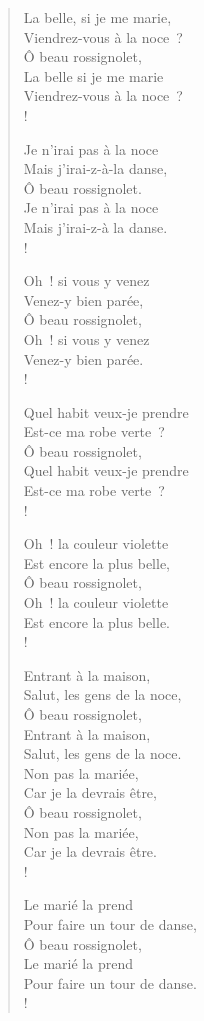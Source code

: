 \documentclass[french,twoside]{book} %
\begin{document}
\begin{verse}
La belle, si je me marie,\\
Viendrez-vous à la noce ?\\
Ô beau rossignolet,\\
La belle si je me marie\\
Viendrez-vous à la noce ?\\!

Je n’irai pas à la noce\\
Mais j’irai-z-à-la danse,\\
Ô beau rossignolet.\\
Je n’irai pas à la noce\\
Mais j’irai-z-à la danse.\\!

Oh ! si vous y venez\\
Venez-y bien parée,\\
Ô beau rossignolet,\\
Oh ! si vous y venez\\
Venez-y bien parée.\\!

Quel habit veux-je prendre\\
Est-ce ma robe verte ?\\
Ô beau rossignolet,\\
Quel habit veux-je prendre\\
Est-ce ma robe verte ?\\!

Oh ! la couleur violette\\
Est encore la plus belle,\\
Ô beau rossignolet,\\
Oh ! la couleur violette\\
Est encore la plus belle.\\!

Entrant à la maison,\\
Salut, les gens de la noce,\\
Ô beau rossignolet,\\
Entrant à la maison,\\
Salut, les gens de la noce.\\
Non pas la mariée,\\
Car je la devrais être,\\
Ô beau rossignolet,\\
Non pas la mariée,\\
Car je la devrais être.\\!

Le marié la prend\\
Pour faire un tour de danse,\\
Ô beau rossignolet,\\
Le marié la prend\\
Pour faire un tour de danse.\\!


\end{verse}
\end{document}
